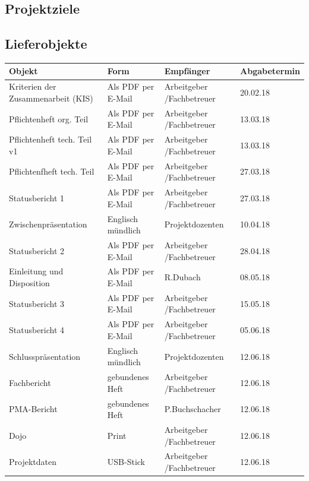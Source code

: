 \pagebreak

\subsection{Projektziele}

\subsection{Lieferobjekte}

\begin{tabular}{|l|l|l|l|}
	\hline 
	Objekt & Form & Empfänger & Abgabetermin \\ 
	\hline 
	Kriterien der Zusammenarbeit (KIS) & Als PDF per E-Mail & Arbeitgeber /Fachbetreuer & 20.02.18  \\ 
	\hline 
	Pflichtenheft org. Teil & Als PDF per E-Mail & Arbeitgeber /Fachbetreuer & 13.03.18 \\ 
	\hline 
	Pflichtenheft tech. Teil v1 & Als PDF per E-Mail & Arbeitgeber /Fachbetreuer & 13.03.18 \\ 
	\hline 
	Pflichtenfheft tech. Teil  & Als PDF per E-Mail & Arbeitgeber /Fachbetreuer & 27.03.18 \\ 
	\hline 
	Statusbericht 1 & Als PDF per E-Mail & Arbeitgeber /Fachbetreuer & 27.03.18 \\ 
	\hline 
	Zwischenpräsentation & Englisch mündlich & Projektdozenten & 10.04.18 \\ 
	\hline 
	Statusbericht 2 & Als PDF per E-Mail & Arbeitgeber /Fachbetreuer & 28.04.18 \\ 
	\hline 
	Einleitung und Disposition & Als PDF per E-Mail & R.Dubach & 08.05.18 \\ 
	\hline 
	Statusbericht 3 & Als PDF per E-Mail & Arbeitgeber /Fachbetreuer & 15.05.18 \\ 
	\hline 
	Statusbericht 4 & Als PDF per E-Mail & Arbeitgeber /Fachbetreuer & 05.06.18 \\ 
	\hline 
	Schlusspräsentation & Englisch mündlich & Projektdozenten & 12.06.18 \\ 
	\hline
	Fachbericht & gebundenes Heft & Arbeitgeber /Fachbetreuer & 12.06.18\\ 
	\hline
	PMA-Bericht & gebundenes Heft & P.Buchschacher & 12.06.18 \\ 
	\hline 
	Dojo & Print & Arbeitgeber /Fachbetreuer & 12.06.18 \\ 
	\hline
	Projektdaten & USB-Stick & Arbeitgeber /Fachbetreuer & 12.06.18 \\ 
	\hline
\end{tabular} 

